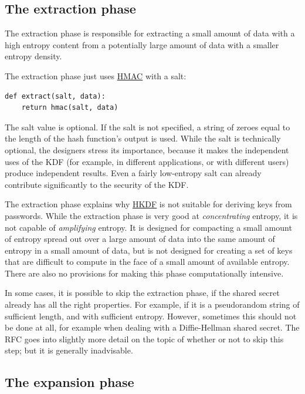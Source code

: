 \documentclass[11pt,ebook,table,dvipsnames]{memoir}
\begin{document}
\subsection{The extraction phase}
\label{sec-2-9-6-1}

The extraction phase is responsible for extracting a small amount of
data with a high entropy content from a potentially large amount of
data with a smaller entropy density.

The extraction phase just uses \hyperref[HMAC]{HMAC} with a salt:

\begin{verbatim}
def extract(salt, data):
    return hmac(salt, data)
\end{verbatim}

The salt value is optional. If the \gls{salt} is not specified, a
string of zeroes equal to the length of the hash function's output is
used. While the salt is technically optional, the designers stress its
importance, because it makes the independent uses of the KDF (for
example, in different applications, or with different users) produce
independent results. Even a fairly low-entropy salt can already
contribute significantly to the security of the KDF. \cite{rfc5869}
\cite{hkdf}

The extraction phase explains why \hyperref[HKDF]{HKDF} is not suitable for deriving
keys from passwords. While the extraction phase is very good at
\emph{concentrating} entropy, it is not capable of \emph{amplifying} entropy. It
is designed for compacting a small amount of entropy spread out over a
large amount of data into the same amount of entropy in a small amount
of data, but is not designed for creating a set of keys that are
difficult to compute in the face of a small amount of available
entropy. There are also no provisions for making this phase
computationally intensive. \cite{rfc5869}

In some cases, it is possible to skip the extraction phase, if the
shared secret already has all the right properties. For example, if it
is a pseudorandom string of sufficient length, and with sufficient
entropy. However, sometimes this should not be done at all, for
example when dealing with a Diffie-Hellman shared secret. The RFC goes
into slightly more detail on the topic of whether or not to skip this
step; but it is generally inadvisable. \cite{rfc5869}
\subsection{The expansion phase}
\label{sec-2-9-6-2}
\end{document}
